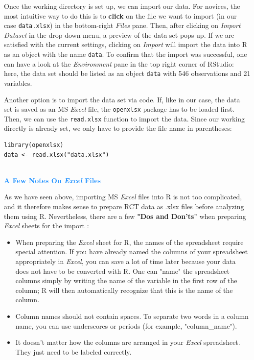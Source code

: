 Once the working directory is set up, we can import our data. For novices, the most intuitive way to do this is to \textbf{click} on the file we want to import (in our case \texttt{data.xlsx}) in the bottom-right \emph{Files} pane. Then, after clicking on \emph{Import Dataset} in the drop-down menu, a preview of the data set pops up. If we are satisfied with the current settings, clicking on \emph{Import} will import the data into \textsf{R} as an object with the name \texttt{data}. To confirm that the import was successful, one can have a look at the \emph{Environment} pane in the top right corner of RStudio: here, the data set should be listed as an object \texttt{data} with 546 observations and 21 variables.

Another option is to import the data set via code. If, like in our case, the data set is saved as an MS \emph{Excel} file, the \texttt{openxlsx} package \citep{openxlsx} has to be loaded first. Then, we can use the \texttt{read.xlsx} function to import the data. Since our working directly is already set, we only have to provide the file name in parentheses:

\begin{lstlisting}
library(openxlsx)
data <- read.xlsx("data.xlsx")
\end{lstlisting}

\begin{box-info} \\

\textcolor{dodgerblue}{\textbf{A Few Notes On \emph{Excel} Files}}

\vspace{2mm}

As we have seen above, importing MS \emph{Excel} files into \textsf{R} is not too complicated, and it therefore makes sense to prepare RCT data as .xlsx files before analyzing them using \textsf{R}. Nevertheless, there are a few \textbf{"Dos and Don'ts"} when preparing \emph{Excel} sheets for the import \citep[chap. 2.4]{harrer2021doing}:

\begin{itemize}
    \item When preparing the \emph{Excel} sheet for \textsf{R}, the names of the spreadsheet require special attention. If you have already named the columns of your spreadsheet appropriately in \emph{Excel}, you can save a lot of time later because your data does not have to be converted with \textsf{R}. One can "name" the spreadsheet columns simply by writing the name of the variable in the first row of the column; \textsf{R} will then automatically recognize that this is the name of the column.
    \item Column names should not contain spaces. To separate two words in a column name, you can use underscores or periods (for example, "column\_name").
    \item It doesn't matter how the columns are arranged in your \emph{Excel} spreadsheet. They just need to be labeled correctly.
\end{itemize}
\end{box-info}


